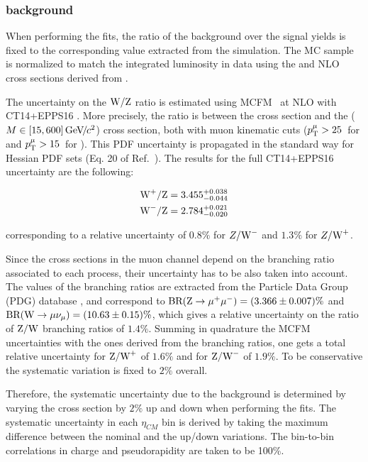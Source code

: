 \subsubsection{\texorpdfstring{\DYToMuMu}\ background}\label{sec:WBoson_Systematic_DYToMuMu}

When performing the fits, the ratio of the \DYToMuMu background over the signal yields is fixed to the corresponding value extracted from the simulation. The MC sample is normalized to match the integrated luminosity in data using the \DYToMuMu and \WToMuNu NLO cross sections derived from \POWHEG.

The uncertainty on the $\text{W}/\text{Z}$ ratio is estimated using MCFM~\cite{MCFM8} at NLO with CT14+EPPS16 \cite{CT14,EPPS16}. More precisely, the ratio is between the \WToMuNu cross section and the \DYToMuMu ($M\in [15,600]{\,\text{Ge\hspace{-.08em}V\hspace{-0.16em}/\hspace{-0.08em}}c^\text{2}}$) cross section, both with muon kinematic cuts ($p_{\mathrm{T}}^{\mu} > 25$~\GeVc for \W and $p_{\mathrm{T}}^{\mu} > 15$~\GeVc for \DY). This PDF uncertainty is propagated in the standard way for Hessian PDF sets (Eq. 20 of Ref.~\cite{PDF4LHC}). The results for the full CT14+EPPS16 uncertainty are the following:

\begin{eqnarray}
 \text{W}^{+} / \text{Z} = 3.455^{+0.038}_{-0.044} \\
 \text{W}^{-} / \text{Z} = 2.784^{+0.021}_{-0.020}
\end{eqnarray}

corresponding to a relative uncertainty of $0.8\%$ for $Z/\text{W}^{-}$ and $1.3\%$ for $Z/\text{W}^{+}$.

Since the cross sections in the muon channel depend on the branching ratio associated to each process, their uncertainty has to be also taken into account. The values of the branching ratios are extracted from the Particle Data Group (PDG) database \cite{PDG}, and correspond to $\textrm{BR}(\text{Z}\to\mu^+\mu^-) = (3.366 \pm 0.007)\%$ and $\textrm{BR}(\text{W}\to\mu\nu_\mu) = (10.63 \pm 0.15)\%$, which gives a relative uncertainty on the ratio of $\text{Z}/\text{W}$ branching ratios of $1.4\%$. Summing in quadrature the MCFM uncertainties with the ones derived from the branching ratios, one gets a total relative uncertainty for $\text{Z}/\text{W}^+$ of $1.6\%$ and for $\text{Z}/\text{W}^-$ of $1.9\%$. To be conservative the systematic variation is fixed to $2\%$ overall.

Therefore, the systematic uncertainty due to the \DYToMuMu background is determined by varying the \DYToMuMu cross section by $2\%$ up and down when performing the fits. The systematic uncertainty in each $\eta_{CM}$ bin is derived by taking the maximum difference between the nominal and the up/down variations. The bin-to-bin correlations in charge and pseudorapidity are taken to be 100\%.

